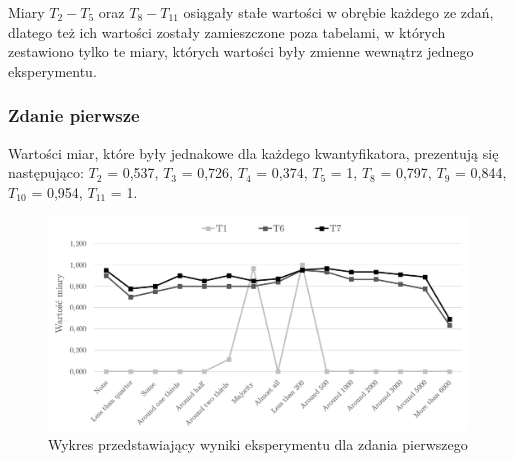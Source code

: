\documentclass{classrep}
\begin{document}
Miary $T_2 - T_5$ oraz $T_8 - T_{11}$ osiągały stałe wartości w obrębie każdego ze zdań, dlatego też ich wartości zostały zamieszczone poza tabelami, w których zestawiono tylko te miary, których wartości były zmienne wewnątrz jednego eksperymentu.

\clearpage



\subsubsection{Zdanie pierwsze}

Wartości miar, które były jednakowe dla każdego kwantyfikatora, prezentują się następująco:
$T_2$ = 0,537, $T_3$ = 0,726, $T_4$ = 0,374, $T_5$ = 1, $T_8$ = 0,797, $T_9$ = 0,844, $T_{10}$ = 0,954, $T_{11}$ = 1.

\begin{figure}[H]
	\centering
	\includegraphics[width=0.99\textwidth]{Pictures/ResultCharts/Eks1_1.png}
	\caption{Wykres przedstawiający wyniki eksperymentu dla zdania pierwszego}
\end{figure}
\end{document}
